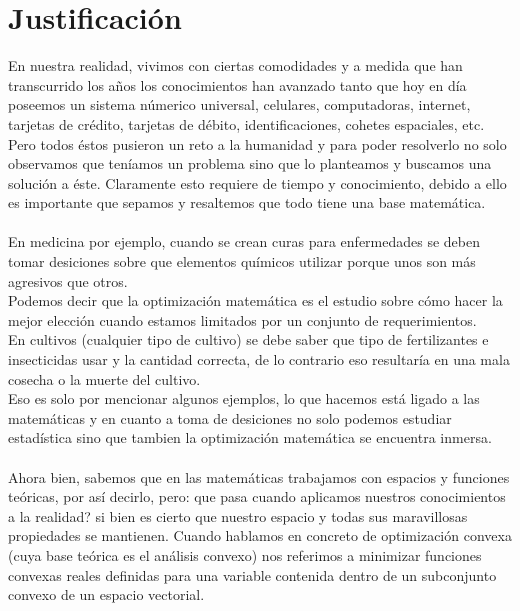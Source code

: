 \section{Justificaci\'on}


En nuestra realidad, vivimos con ciertas comodidades y a medida que han transcurrido los a\~nos  los conocimientos han avanzado tanto
que hoy en d\'ia poseemos un sistema n\'umerico universal, celulares, computadoras, internet, tarjetas de cr\'edito, 
tarjetas de d\'ebito, identificaciones, cohetes espaciales, etc. Pero todos \'estos pusieron un reto a la humanidad y para poder
resolverlo no solo observamos que ten\'iamos un problema sino que lo planteamos y buscamos una soluci\'on a \'este. Claramente
esto requiere de tiempo y conocimiento, debido a ello es importante que sepamos y resaltemos que todo tiene una base matem\'atica.\\ \\

En medicina por ejemplo, cuando se crean curas para enfermedades se deben tomar desiciones sobre que elementos qu\'imicos utilizar porque 
unos son m\'as agresivos que otros.\\

Podemos decir que la optimizaci\'on matem\'atica es el estudio sobre c\'omo hacer la mejor elecci\'on cuando estamos limitados por un
conjunto de requerimientos. \\  

En cultivos (cualquier tipo de cultivo) se debe saber que tipo de fertilizantes e insecticidas usar y la cantidad correcta, de lo contrario
eso resultar\'ia en una mala cosecha o la muerte del cultivo.\\

Eso es solo por mencionar algunos ejemplos, lo que hacemos est\'a ligado a las matem\'aticas y en cuanto a toma de desiciones no solo podemos
estudiar estad\'istica sino que tambien la optimizaci\'on matem\'atica se encuentra inmersa.\\ \\

Ahora bien, sabemos que en las matem\'aticas trabajamos con espacios y funciones te\'oricas, por as\'i decirlo, pero: que pasa cuando aplicamos 
nuestros conocimientos a la realidad? si bien es cierto que nuestro espacio y todas sus maravillosas propiedades se mantienen. Cuando hablamos
en concreto de optimizaci\'on convexa (cuya base te\'orica es el an\'alisis convexo) nos referimos a minimizar funciones convexas reales 
definidas para una variable contenida dentro de un subconjunto convexo de un espacio vectorial. \\

